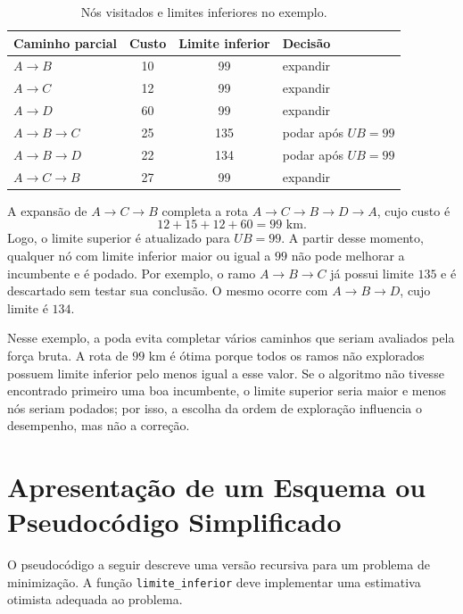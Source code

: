 \begin{table}[htb]
\centering
\caption{Nós visitados e limites inferiores no exemplo.}
\label{tab:bnb-limites}
\renewcommand{\arraystretch}{1.25}
\begin{tabular}{|l|c|c|l|}
\hline
\rowcolor{gray!20}
\textbf{Caminho parcial} & \textbf{Custo} & \textbf{Limite inferior} & \textbf{Decisão} \\ \hline
$A\rightarrow B$ & 10 & 99 & expandir \\ \hline
$A\rightarrow C$ & 12 & 99 & expandir \\ \hline
$A\rightarrow D$ & 60 & 99 & expandir \\ \hline
$A\rightarrow B\rightarrow C$ & 25 & 135 & podar após $UB=99$ \\ \hline
$A\rightarrow B\rightarrow D$ & 22 & 134 & podar após $UB=99$ \\ \hline
$A\rightarrow C\rightarrow B$ & 27 & 99 & expandir \\ \hline
\end{tabular}
\end{table}

A expansão de $A\rightarrow C\rightarrow B$ completa a rota $A\rightarrow C\rightarrow B\rightarrow D\rightarrow A$, cujo custo é
\begin{equation}
    12 + 15 + 12 + 60 = 99\text{ km}.
\end{equation}
Logo, o limite superior é atualizado para $UB=99$. A partir desse momento, qualquer nó com limite inferior maior ou igual a $99$ não pode melhorar a incumbente e é podado. Por exemplo, o ramo $A\rightarrow B\rightarrow C$ já possui limite $135$ e é descartado sem testar sua conclusão. O mesmo ocorre com $A\rightarrow B\rightarrow D$, cujo limite é $134$.

Nesse exemplo, a poda evita completar vários caminhos que seriam avaliados pela força bruta. A rota de $99$ km é ótima porque todos os ramos não explorados possuem limite inferior pelo menos igual a esse valor. Se o algoritmo não tivesse encontrado primeiro uma boa incumbente, o limite superior seria maior e menos nós seriam podados; por isso, a escolha da ordem de exploração influencia o desempenho, mas não a correção.

\section{Apresentação de um Esquema ou Pseudocódigo Simplificado}

O pseudocódigo a seguir descreve uma versão recursiva para um problema de minimização. A função \texttt{limite\_inferior} deve implementar uma estimativa otimista adequada ao problema.


